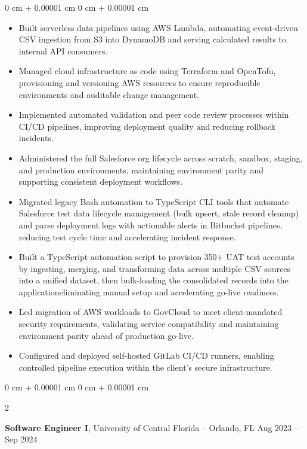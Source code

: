 \documentclass[10pt, letterpaper]{article}
\newenvironment{highlights}{
    \begin{itemize}[
        topsep=0.10 cm,
        parsep=0.10 cm,
        partopsep=0pt,
        itemsep=0pt,
        leftmargin=0 cm + 10pt
    ]
}{
    \end{itemize}
} %
\newenvironment{onecolentry}{
    \begin{adjustwidth}{
        0 cm + 0.00001 cm
    }{
        0 cm + 0.00001 cm
    }
}{
    \end{adjustwidth}
} %
\newenvironment{twocolentry}[2][]{
    \onecolentry
    \def\secondColumn{#2}
    \setcolumnwidth{\fill, 4.5 cm}
    \begin{paracol}{2}
}{
    \switchcolumn \raggedleft \secondColumn
    \end{paracol}
    \endonecolentry
} %
\begin{document}
\vspace{0.10 cm}
\begin{onecolentry}
	\begin{highlights}
		\item Built serverless data pipelines using AWS Lambda, automating event-driven CSV ingestion from S3 into DynamoDB and serving calculated results to internal API consumers.
		\item Managed cloud infrastructure as code using Terraform and OpenTofu, provisioning and versioning AWS resources to ensure reproducible environments and auditable change management.
		\item Implemented automated validation and peer code review processes within CI/CD pipelines, improving deployment quality and reducing rollback incidents.
		\item Administered the full Salesforce org lifecycle across scratch, sandbox, staging, and production environments, maintaining environment parity and supporting consistent deployment workflows.
		\item Migrated legacy Bash automation to TypeScript CLI tools that automate Salesforce test data lifecycle management (bulk upsert, stale record cleanup) and parse deployment logs with actionable alerts in Bitbucket pipelines, reducing test cycle time and accelerating incident response.
		\item Built a TypeScript automation script to provision 350+ UAT test accounts by ingesting, merging, and transforming data across multiple CSV sources into a unified dataset, then bulk-loading the consolidated records into the application\textemdash{}eliminating manual setup and accelerating go-live readiness.
		\item Led migration of AWS workloads to GovCloud to meet client-mandated security requirements, validating service compatibility and maintaining environment parity ahead of production go-live.
		\item Configured and deployed self-hosted GitLab CI/CD runners, enabling controlled pipeline execution within the client's secure infrastructure.
	\end{highlights}
\end{onecolentry}


\vspace{0.2 cm}

\begin{twocolentry}{
		Aug 2023 – Sep 2024
	}
	\textbf{Software Engineer I}, University of Central Florida -- Orlando, FL\end{twocolentry}
\end{document}

